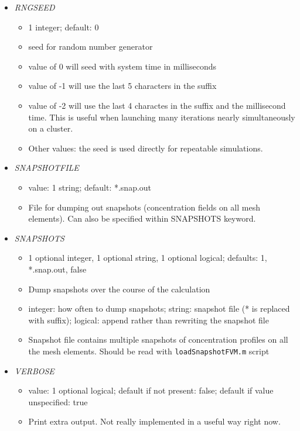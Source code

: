\documentclass[12pt]{article}
\begin{document}
\begin{itemize}
%
\item {\it RNGSEED}
  \begin{itemize}
    \item 1 integer; default: 0
    \item seed for random number generator
    \item value of 0 will seed with system time in milliseconds
    \item value of -1 will use the last 5 characters in the suffix
    \item value of -2 will use the last 4 charactes in the suffix and the millisecond time. This is useful when launching many iterations nearly simultaneously on a cluster.
    \item Other values: the seed is used directly for repeatable simulations. 
  \end{itemize}
%
\item {\it SNAPSHOTFILE}
    \begin{itemize}
      \item  value: 1 string; default: *.snap.out
      \item File for dumping out snapshots (concentration fields on all mesh elements). Can also be specified within SNAPSHOTS keyword.
    \end{itemize}
%
\item {\it SNAPSHOTS}
\begin{itemize}
	\item 1 optional integer, 1 optional string, 1 optional logical; defaults: 1, *.snap.out, false
	\item Dump snapshots over the course of the calculation
	\item integer: how often to dump snapshots; string: snapshot file (* is replaced with suffix); logical: append rather than rewriting the snapshot file
	\item Snapshot file contains multiple snapshots of concentration profiles on all the mesh elements. Should be read with \verb=loadSnapshotFVM.m= script
\end{itemize}
%
\item {\it VERBOSE}
        \begin{itemize}
          \item  value: 1 optional logical; default if not present: false; default if value unspecified: true
          \item Print extra output. Not really implemented in a useful way right now.
        \end{itemize}

\end{itemize}

%
%
\end{document}
